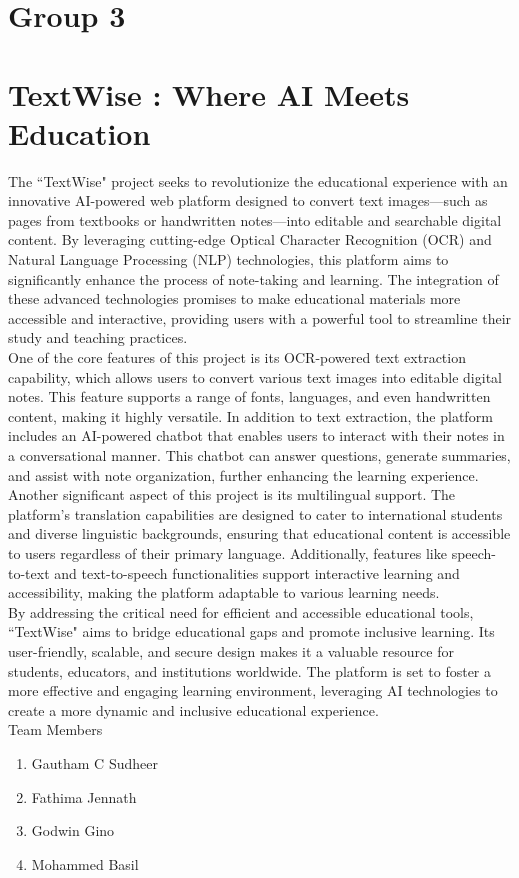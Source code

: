 \documentclass[12pt]{book}
\begin{document}
	\thispagestyle{empty}
	\section*{Group 3}
	\section*{TextWise : Where AI Meets Education}
	The ``TextWise" project seeks to revolutionize the educational experience with an innovative AI-powered web platform designed to convert text images—such as pages from textbooks or handwritten notes—into editable and searchable digital content. By leveraging cutting-edge Optical Character Recognition (OCR) and Natural Language Processing (NLP) technologies, this platform aims to significantly enhance the process of note-taking and learning. The integration of these advanced technologies promises to make educational materials more accessible and interactive, providing users with a powerful tool to streamline their study and teaching practices.\\
	
	One of the core features of this project is its OCR-powered text extraction capability, which allows users to convert various text images into editable digital notes. This feature supports a range of fonts, languages, and even handwritten content, making it highly versatile. In addition to text extraction, the platform includes an AI-powered chatbot that enables users to interact with their notes in a conversational manner. This chatbot can answer questions, generate summaries, and assist with note organization, further enhancing the learning experience. Another significant aspect of this project is its multilingual support. The platform’s translation capabilities are designed to cater to international students and diverse linguistic backgrounds, ensuring that educational content is accessible to users regardless of their primary language. Additionally, features like speech-to-text and text-to-speech functionalities support interactive learning and accessibility, making the platform adaptable to various learning needs.\\
	
	By addressing the critical need for efficient and accessible educational tools, ``TextWise" aims to bridge educational gaps and promote inclusive learning. Its user-friendly, scalable, and secure design makes it a valuable resource for students, educators, and institutions worldwide. The platform is set to foster a more effective and engaging learning environment, leveraging AI technologies to create a more dynamic and inclusive educational experience.\\
	
	\bigskip
	Team Members
	\begin{enumerate}
		\item Gautham C Sudheer
		\item Fathima Jennath
		\item Godwin Gino
		\item Mohammed Basil
	\end{enumerate}
	\bigskip
	
\end{document}
